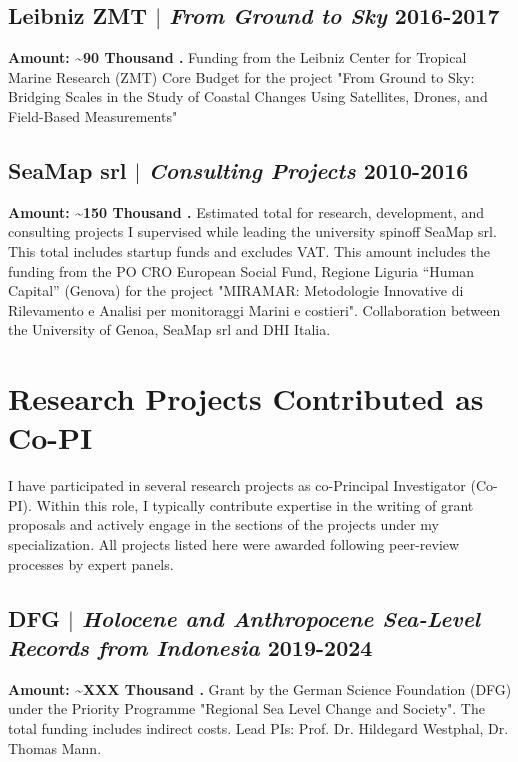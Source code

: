 \documentclass[11pt]{article}
\begin{document}
\subsection{Leibniz ZMT $|$ {\normalfont\textit{From Ground to Sky}} \hfill 2016-2017}
{\footnotesize \textbf{Amount: \textasciitilde90 Thousand \texteuro.} Funding from the Leibniz Center for Tropical Marine Research (ZMT) Core Budget for the project "From Ground to Sky: Bridging Scales in the Study of Coastal Changes Using Satellites, Drones, and Field-Based Measurements"}
\bigskip

\subsection{SeaMap srl $|$ {\normalfont\textit{Consulting Projects}} \hfill 2010-2016}
{\footnotesize \textbf{Amount: \textasciitilde150 Thousand \texteuro.} Estimated total for research, development, and consulting projects I supervised while leading the university spinoff SeaMap srl. This total includes startup funds and excludes VAT. This amount includes the funding from the PO CRO European Social Fund, Regione Liguria “Human Capital” (Genova) for the project "MIRAMAR: Metodologie Innovative di Rilevamento e Analisi per monitoraggi Marini e costieri". Collaboration between the University of Genoa, SeaMap srl and DHI Italia.}
\bigskip

\newpage
\section{Research Projects Contributed as Co-PI}
{\normalfont I have participated in several research projects as co-Principal Investigator (Co-PI). Within this role, I typically contribute expertise in the writing of grant proposals and actively engage in the sections of the projects under my specialization. All projects listed here were awarded following peer-review processes by expert panels.}\\

\subsection{DFG $|$ {\normalfont\textit{Holocene and Anthropocene Sea-Level Records from Indonesia}} \hfill 2019-2024}
{\footnotesize \textbf{Amount: \textasciitilde XXX Thousand \texteuro.} Grant by the German Science Foundation (DFG) under the Priority Programme "Regional Sea Level Change and Society". The total funding includes indirect costs. Lead PIs: Prof. Dr. Hildegard Westphal, Dr. Thomas Mann.}
\bigskip
\end{document}
